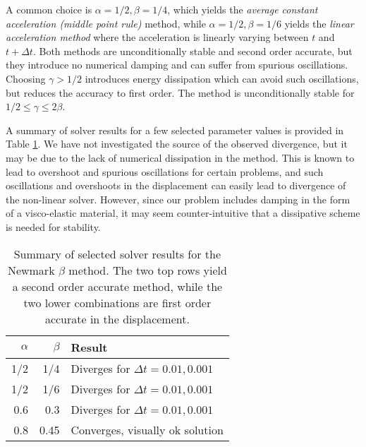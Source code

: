 \documentclass[a4paper,10pt]{article}
\begin{document}
A common choice is $\alpha=1/2, \beta=1/4$, which yields
the \emph{average constant acceleration (middle point rule)} method, while $\alpha=1/2, \beta=1/6$
yields the \emph{linear acceleration method} where the acceleration is linearly varying between
$t$ and $t+\Delta t$. Both methods are unconditionally stable and second order accurate, but
they introduce no numerical damping and can suffer from spurious oscillations. Choosing $\gamma > 1/2$
introduces energy dissipation which can avoid such oscillations, but reduces the
accuracy to first order. The method is unconditionally stable for $1/2 \leq \gamma \leq 2\beta$.

A summary of solver results for a few selected parameter values is provided in
Table \ref{tab:conv_res}. We have not investigated the source of the
observed divergence, but it may be due to the lack of
numerical dissipation in the method. This is known to lead to overshoot
and spurious oscillations for certain problems, and such oscillations and
overshoots in the displacement can easily lead to divergence of the non-linear
solver. However, since our problem includes damping in the form of a visco-elastic
material, it may seem counter-intuitive that a dissipative scheme is needed for stability.

\begin{table}[htb]
  \begin{center}
    \begin{tabular}{|r|r|l|}
      \hline
      $\alpha$ & $\beta $& Result \\
      \hline \hline
      1/2 & 1/4 &  Diverges for $\Delta t = 0.01, 0.001$ \\ \hline
      1/2 & 1/6 &  Diverges for $\Delta t = 0.01, 0.001$ \\ \hline
      0.6 & 0.3 & Diverges for $\Delta t = 0.01, 0.001$ \\ \hline
      0.8 & 0.45 & Converges, visually ok solution \\ \hline
    \end{tabular}
  \end{center}
  \caption{Summary of selected solver results for the Newmark $\beta$ method. The two
  top rows yield a second order accurate method, while the two lower combinations
  are first order accurate in the displacement.}
  \label{tab:conv_res}
\end{table}
\end{document}
